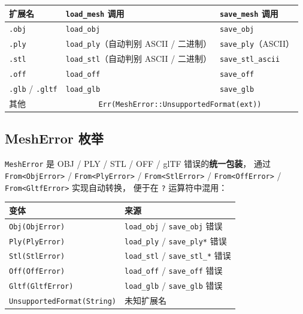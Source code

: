 \documentclass[11pt,a4paper]{article}
\begin{document}
\begin{center}
\renewcommand{\arraystretch}{1.18}
\begin{tabular}{@{}lll@{}}
  \toprule
  \textbf{扩展名} & \texttt{load\_mesh} 调用 & \texttt{save\_mesh} 调用 \\
  \midrule
  \texttt{.obj}              & \texttt{load\_obj}  & \texttt{save\_obj} \\
  \texttt{.ply}              & \texttt{load\_ply}（自动判别 ASCII / 二进制） & \texttt{save\_ply}（ASCII） \\
  \texttt{.stl}              & \texttt{load\_stl}（自动判别 ASCII / 二进制） & \texttt{save\_stl\_ascii} \\
  \texttt{.off}              & \texttt{load\_off}  & \texttt{save\_off} \\
  \texttt{.glb} / \texttt{.gltf} & \texttt{load\_glb} & \texttt{save\_glb} \\
  其他 & \multicolumn{2}{c}{\texttt{Err(MeshError::UnsupportedFormat(ext))}} \\
  \bottomrule
\end{tabular}
\end{center}

\subsection{MeshError 枚举}

\texttt{MeshError} 是 OBJ / PLY / STL / OFF / glTF 错误的\textbf{统一包装}，
通过 \texttt{From<ObjError>} / \texttt{From<PlyError>} / \texttt{From<StlError>}
/ \texttt{From<OffError>} / \texttt{From<GltfError>} 实现自动转换，
便于在 \texttt{?} 运算符中混用：

\begin{center}
\renewcommand{\arraystretch}{1.18}
\begin{tabular}{@{}ll@{}}
  \toprule
  \textbf{变体} & \textbf{来源} \\
  \midrule
  \texttt{Obj(ObjError)}                & \texttt{load\_obj} / \texttt{save\_obj} 错误 \\
  \texttt{Ply(PlyError)}                & \texttt{load\_ply} / \texttt{save\_ply*} 错误 \\
  \texttt{Stl(StlError)}                & \texttt{load\_stl} / \texttt{save\_stl\_*} 错误 \\
  \texttt{Off(OffError)}                & \texttt{load\_off} / \texttt{save\_off} 错误 \\
  \texttt{Gltf(GltfError)}              & \texttt{load\_glb} / \texttt{save\_glb} 错误 \\
  \texttt{UnsupportedFormat(String)}    & 未知扩展名 \\
  \bottomrule
\end{tabular}
\end{center}
\end{document}
